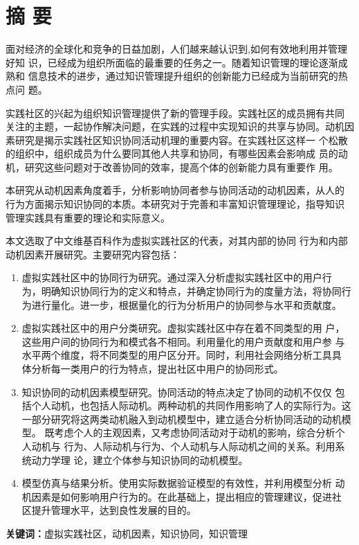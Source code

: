 \documentclass[adobefonts,cs4size,a4paper,openany]{ctexbook}
\begin{document}
\chapter*{摘 \quad 要}

面对经济的全球化和竞争的日益加剧，人们越来越认识到,如何有效地利用并管理好知
识，已经成为组织所面临的最重要的任务之一。随着知识管理的理论逐渐成熟和
信息技术的进步，通过知识管理提升组织的创新能力已经成为当前研究的热点问
题。

实践社区的兴起为组织知识管理提供了新的管理手段。实践社区的成员拥有共同
关注的主题，一起协作解决问题，在实践的过程中实现知识的共享与协同。动机因素研究是揭示实践社区知识协同活动机理的重要内容。在实践社区这样一
个松散的组织中，组织成员为什么要同其他人共享和协同，有哪些因素会影响成
员的动机，研究这些问题对于改善协同的效率，提高个体的创新能力具有重要作
用。

本研究从动机因素角度着手，分析影响协同者参与协同活动的动机因素，从人的
行为方面揭示知识协同的本质。本研究对于完善和丰富知识管理理论，指导知识
管理实践具有重要的理论和实际意义。

本文选取了中文维基百科作为虚拟实践社区的代表，对其内部的协同
行为和内部动机因素开展研究。主要研究内容包括：

\begin{enumerate}
\item 虚拟实践社区中的协同行为研究。通过深入分析虚拟实践社区中的用户行
  为，明确知识协同行为的定义和特点，并确定协同行为的度量方法，将协同行
  为进行量化。进一步，根据量化的行为分析用户的协同参与水平和贡献度。
\item 虚拟实践社区中的用户分类研究。虚拟实践社区中存在着不同类型的用
  户，这些用户间的协同行为和模式各不相同。利用量化的用户贡献度和用户参
  与水平两个维度，将不同类型的用户区分开。同时，利用社会网络分析工具具
  体分析每一类用户的行为特点，提出社区中用户的协同形式。
\item 知识协同的动机因素模型研究。协同活动的特点决定了协同的动机不仅仅
包括个人动机，也包括人际动机。两种动机的共同作用影响了人的实际行为。这
一部分研究将这两类动机融入到动机模型中，建立适合分析协同活动的动机模型。
既考虑个人的主观因素，又考虑协同活动对于动机的影响，综合分析个人动机与
行为、人际动机与行为、个人动机与人际动机之间的关系。利用系统动力学理
论，建立个体参与知识协同的动机模型。
\item 模型仿真与结果分析。使用实际数据验证模型的有效性，并利用模型分析
  动机因素是如何影响用户行为的。在此基础上，提出相应的管理建议，促进社
  区提升管理水平，达到良性发展的目的。

\end{enumerate}

\textbf{关键词：}虚拟实践社区，动机因素，知识协同，知识管理
\end{document}
